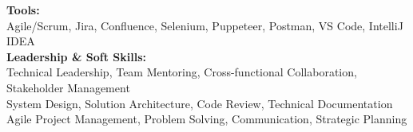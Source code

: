 \begin{itemize}[leftmargin=0.15in, label={}]
{{     \textbf{Tools:} \\
     \quad \textbullet{} Agile/Scrum, Jira, Confluence, Selenium, Puppeteer, Postman, VS Code, IntelliJ IDEA \\ \vspace{2pt}
     \textbf{Leadership \& Soft Skills:} \\
     \quad \textbullet{} Technical Leadership, Team Mentoring, Cross-functional Collaboration, Stakeholder Management \\ 
     \quad \textbullet{} System Design, Solution Architecture, Code Review, Technical Documentation \\
     \quad \textbullet{} Agile Project Management, Problem Solving, Communication, Strategic Planning
    }}
 \end{itemize}